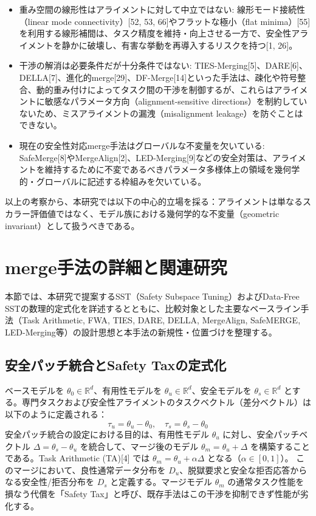 \documentclass{article}
\begin{document}
\begin{itemize}
\item 重み空間の線形性はアライメントに対して中立ではない: 線形モード接続性（linear mode connectivity）[52, 53, 66]やフラットな極小（flat minima）[55]を利用する線形補間は、タスク精度を維持・向上させる一方で、安全性アライメントを静かに破壊し、有害な挙動を再導入するリスクを持つ[1, 26]。
\item 干渉の解消は必要条件だが十分条件ではない: TIES-Merging[5]、DARE[6]、DELLA[7]、進化的merge[29]、DF-Merge[14]といった手法は、疎化や符号整合、動的重み付けによってタスク間の干渉を制御するが、これらはアライメントに敏感なパラメータ方向（alignment-sensitive directions）を制約していないため、ミスアライメントの漏洩（misalignment leakage）を防ぐことはできない。
\item 現在の安全性対応merge手法はグローバルな不変量を欠いている: SafeMerge[8]やMergeAlign[2]、LED-Merging[9]などの安全対策は、アライメントを維持するために不変であるべきパラメータ多様体上の領域を幾何学的・グローバルに記述する枠組みを欠いている。
\end{itemize}

以上の考察から、本研究では以下の中心的立場を採る：アライメントは単なるスカラー評価値ではなく、モデル族における幾何学的な不変量（geometric invariant）として扱うべきである。

\section{merge手法の詳細と関連研究}
本節では、本研究で提案するSST（Safety Subspace Tuning）およびData-Free SSTの数理的定式化を詳述するとともに、比較対象とした主要なベースライン手法（Task Arithmetic, FWA, TIES, DARE, DELLA, MergeAlign, SafeMERGE, LED-Merging等）の設計思想と本手法の新規性・位置づけを整理する。

\subsection{安全パッチ統合とSafety Taxの定式化}
ベースモデルを $\theta_0 \in \mathbb{R}^d$、有用性モデルを $\theta_u \in \mathbb{R}^d$、安全モデルを $\theta_s \in \mathbb{R}^d$ とする。専門タスクおよび安全性アライメントのタスクベクトル（差分ベクトル）は以下のように定義される：
\[ \tau_u = \theta_u - \theta_0, \quad \tau_s = \theta_s - \theta_0 \]
安全パッチ統合の設定における目的は、有用性モデル $\theta_u$ に対し、安全パッチベクトル $\Delta = \theta_s - \theta_u$ を統合して、マージ後のモデル $\theta_m = \theta_u + \Delta$ を構築することである。Task Arithmetic (TA)[4] では $\theta_m = \theta_u + \alpha \Delta$ となる（$\alpha \in [0, 1]$）。
このマージにおいて、良性通常データ分布を $D_u$、脱獄要求と安全な拒否応答からなる安全性/拒否分布を $D_s$ と定義する。マージモデル $\theta_m$ の通常タスク性能を損なう代償を「Safety Tax」と呼び、既存手法はこの干渉を抑制できず性能が劣化する。
\end{document}
